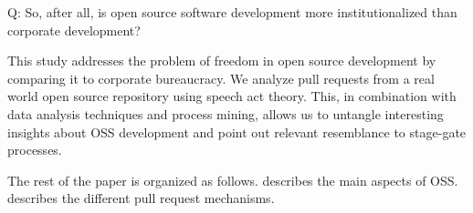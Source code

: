 Q:
So, after all, is open source software development more institutionalized than corporate development?


This study addresses the problem of freedom in open source development by comparing it to corporate bureaucracy. We analyze pull requests from a real world open source repository using speech act theory. This, in combination with data analysis techniques and process mining, allows us to untangle interesting insights about OSS development and point out relevant resemblance to stage-gate processes. 

The rest of the paper is organized as follows.  describes the main aspects of OSS.  describes the different pull request mechanisms. 